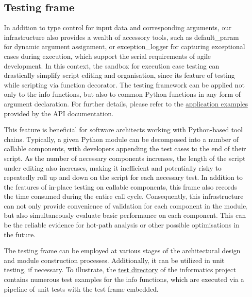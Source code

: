 \documentclass[a4paper,12pt]{article}
\newcommand{\inlinecode}[1]{{\ttfamily\footnotesize{#1}}}
\begin{document}
\subsection*{Testing frame}

In addition to type control for input data and corresponding arguments, our infrastructure also provides a wealth of accessory tools, such as \inlinecode{default\_param} for dynamic argument assignment, or \inlinecode{exception\_logger} for capturing exceptional cases during execution, which support the serial requirements of agile development. In this context, the sandbox for execution case testing can drastically simplify script editing and organisation, since its feature of testing while scripting via function decorator. The testing framework can be applied not only to the info functions, but also to common Python functions in any form of argument declaration. For further details, please refer to the \href{https://informatics.readthedocs.io/en/latest/interface/api\_frame.html#decorator-to-do-function-testing}{application examples} provided by the API documentation.\par

This feature is beneficial for software architects working with Python-based tool chains. Typically, a given Python module can be decomposed into a number of callable components, with developers appending the test cases to the end of their script. As the number of necessary components increases, the length of the script under editing also increases, making it inefficient and potentially risky to repeatedly roll up and down on the script for each necessary test. In addition to the features of in-place testing on callable components, this frame also records the time consumed during the entire call cycle. Consequently, this infrastructure can not only provide convenience of validation for each component in the module, but also simultaneously evaluate basic performance on each component. This can be the reliable evidence for hot-path analysis or other possible optimisations in the future.\par

The testing frame can be employed at various stages of the architectural design and module construction processes. Additionally, it can be utilized in unit testing, if necessary. To illustrate, the \href{https://github.com/CubicZebra/informatics/tree/main/test}{test directory} of the informatics project contains numerous test examples for the info functions, which are executed via a pipeline of unit tests with the test frame embedded.\par
\end{document}

